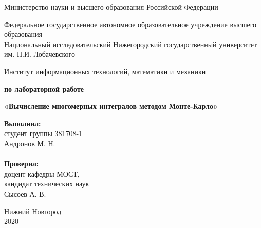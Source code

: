 \documentclass{report}
\begin{document}
\begin{titlepage}

\begin{center}
Министерство науки и высшего образования Российской Федерации
\end{center}

\begin{center}
Федеральное государственное автономное образовательное учреждение высшего образования \\
Национальный исследовательский Нижегородский государственный университет им. Н.И. Лобачевского
\end{center}

\begin{center}
Институт информационных технологий, математики и механики
\end{center}

\vspace{4em}

\begin{center}
\textbf{ по лабораторной работе} \\
\end{center}
\begin{center}
\textbf{\Large«Вычисление многомерных интегралов методом Монте-Карло»} \\
\end{center}

\vspace{4em}

\newbox{\lbox}
\newlength{\maxl}
\setlength{\maxl}{\wd\lbox}
\hfill\parbox{7cm}{
\hspace*{5cm}\hspace*{-5cm}\textbf{Выполнил:} \\ студент группы 381708-1 \\ Андронов М. Н.\\
\\
\hspace*{5cm}\hspace*{-5cm}\textbf{Проверил:}\\ доцент кафедры МОСТ, \\ кандидат технических наук \\ Сысоев А. В.
}

\vspace{\fill}

\begin{center} Нижний Новгород \\ 2020 \end{center}

\end{titlepage}
\end{document}
